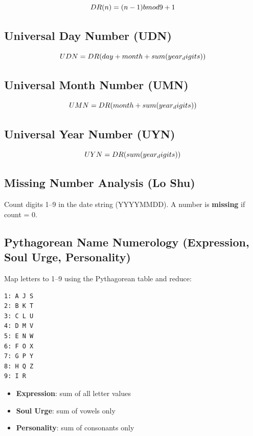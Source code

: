 \documentclass[
  11pt,
  a4paper,
  oneside,
  openany]{article}
\providecommand{\tightlist}{%
  \setlength{\itemsep}{0pt}\setlength{\parskip}{0pt}}\usepackage{longtable,booktabs,array}
\begin{document}
\[
DR(n) = (n - 1) \\bmod 9 + 1
\]

\subsection{Universal Day Number (UDN)}\label{universal-day-number-udn}

\[
UDN = DR(day + month + sum(year\\_digits))
\]

\subsection{Universal Month Number
(UMN)}\label{universal-month-number-umn}

\[
UMN = DR(month + sum(year\\_digits))
\]

\subsection{Universal Year Number
(UYN)}\label{universal-year-number-uyn}

\[
UYN = DR(sum(year\\_digits))
\]

\subsection{Missing Number Analysis (Lo
Shu)}\label{missing-number-analysis-lo-shu}

Count digits 1--9 in the date string (YYYYMMDD). A number is
\textbf{missing} if count = 0.

\subsection{Pythagorean Name Numerology (Expression, Soul Urge,
Personality)}\label{pythagorean-name-numerology-expression-soul-urge-personality}

Map letters to 1--9 using the Pythagorean table and reduce:

\begin{verbatim}
1: A J S
2: B K T
3: C L U
4: D M V
5: E N W
6: F O X
7: G P Y
8: H Q Z
9: I R
\end{verbatim}

\begin{itemize}
\tightlist
\item
  \textbf{Expression}: sum of all letter values
\item
  \textbf{Soul Urge}: sum of vowels only
\item
  \textbf{Personality}: sum of consonants only
\end{itemize}
\end{document}

